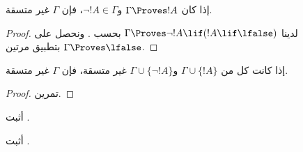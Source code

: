 \documentclass[../../../include/open-logic-section]{subfiles}
\begin{document}
\begin{prop}
  إذا كان $\Gamma \Proves !A$ و$\lnot !A \in \Gamma$، فإن $\Gamma$
  غير متسقة.
\end{prop}

\begin{proof}
  لدينا $\Gamma \Proves \lnot !A \lif (!A \lif \lfalse)$ بحسب
  . ونحصل على $\Gamma \Proves \lfalse$ بتطبيق
   مرتين.
\end{proof}


\begin{prop}
  إذا كانت كل من $\Gamma \cup \{!A\}$ و$\Gamma \cup \{\lnot !A\}$
  غير متسقة، فإن $\Gamma$ غير متسقة.
\end{prop}

\begin{proof}
تمرين.
\end{proof}

\begin{prob}
  أثبت .
\end{prob}
\tagendprob

\begin{prob}
  أثبت .
\end{prob}
\tagendprob
\end{document}
